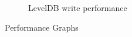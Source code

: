 \begin{figure}
\begin{subfigure}{.5\textwidth}
  \vspace{-0.05in}
  \caption{LevelDB write performance}
  \vspace{0.1in}
  \label{fig:sub8}
\end{subfigure}
  \caption{Performance Graphs}
  \label{graphs}
\end{figure}
\clearpage
